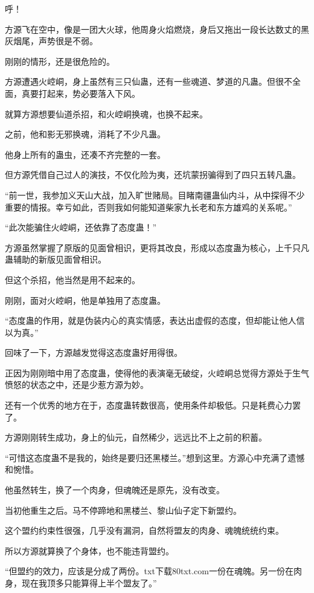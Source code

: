 
\begin{this_body}

呼！

方源飞在空中，像是一团大火球，他周身火焰燃烧，身后又拖出一段长达数丈的黑灰烟尾，声势很是不弱。

刚刚的情形，还是很危险的。

方源遭遇火崆峒，身上虽然有三只仙蛊，还有一些魂道、梦道的凡蛊。但很不全面，真要打起来，势必要落入下风。

就算方源想要仙道杀招，和火崆峒换魂，也换不起来。

之前，他和影无邪换魂，消耗了不少凡蛊。

他身上所有的蛊虫，还凑不齐完整的一套。

但方源凭借自己过人的演技，不仅化险为夷，还坑蒙拐骗得到了四只五转凡蛊。

“前一世，我参加义天山大战，加入旷世赌局。目睹南疆蛊仙内斗，从中探得不少重要的情报。幸亏如此，否则我如何能知道柴家九长老和东方雄鸡的关系呢。”

“此次能骗住火崆峒，还依靠了态度蛊！”

方源虽然掌握了原版的见面曾相识，更将其改良，形成以态度蛊为核心，上千只凡蛊辅助的新版见面曾相识。

但这个杀招，他当然是用不起来的。

刚刚，面对火崆峒，他是单独用了态度蛊。

“态度蛊的作用，就是伪装内心的真实情感，表达出虚假的态度，但却能让他人信以为真。”

回味了一下，方源越发觉得这态度蛊好用得很。

正因为刚刚暗中用了态度蛊，使得他的表演毫无破绽，火崆峒总觉得方源处于生气愤怒的状态之中，还是少惹方源为妙。

还有一个优秀的地方在于，态度蛊转数很高，使用条件却极低。只是耗费心力罢了。

方源刚刚转生成功，身上的仙元，自然稀少，远远比不上之前的积蓄。

“可惜这态度蛊不是我的，始终是要归还黑楼兰。”想到这里。方源心中充满了遗憾和惋惜。

他虽然转生，换了一个肉身，但魂魄还是原先，没有改变。

当初他重生之后。马不停蹄地和黑楼兰、黎山仙子定下新盟约。

这个盟约约束性很强，几乎没有漏洞，自然将盟友的肉身、魂魄统统约束。

所以方源就算换了个身体，也不能违背盟约。

“但盟约的效力，应该是分成了两份。txt下载80txt.com一份在魂魄。另一份在肉身，现在我顶多只能算得上半个盟友了。”


\end{this_body}
